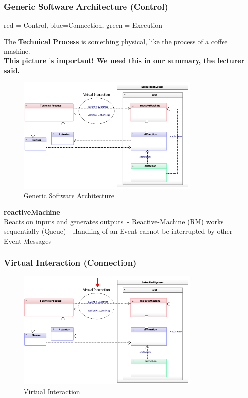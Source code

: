 \hypertarget{generic-software-architecture-control}{%
\subsubsection{Generic Software Architecture
(Control)}\label{generic-software-architecture-control}}

red = Control, blue=Connection, green = Execution

The \textbf{Technical Process} is something physical, like the process
of a coffee mashine.\\
\textbf{This picture is important! We need this in our summary, the
lecturer said.}

\begin{figure}[H]
\centering
\includegraphics[width=0.8\textwidth]{figures/genericSoftwareArchitecture.png}
\caption{Generic Software Architecture}
\end{figure}

\textbf{reactiveMachine}\\
Reacts on inputs and generates outputs. - Reactive-Machine (RM) works
sequentially (Queue) - Handling of an Event cannot be interrupted by
other Event-Messages

\hypertarget{virtual-interaction-connection}{%
\subsubsection{Virtual Interaction
(Connection)}\label{virtual-interaction-connection}}

\begin{figure}[H]
\centering
\includegraphics[width=0.8\textwidth]{figures/virtualInteraction.png}
\caption{Virtual Interaction}
\end{figure}

